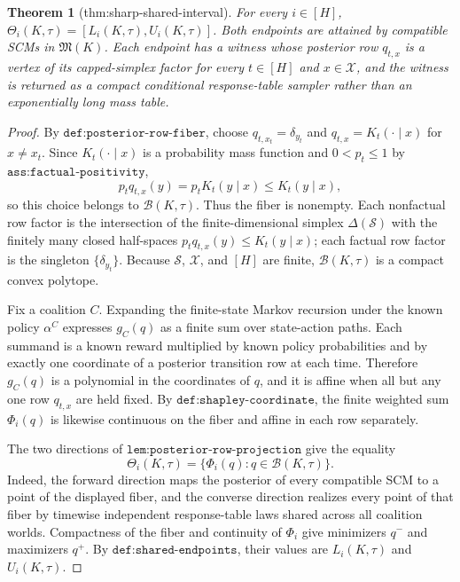 \documentclass{article}
\newtheorem{theorem}{Theorem}
\begin{document}
\begin{theorem}[thm:sharp-shared-interval]\label{thm:sharp-shared-interval}
For every \(i\in[H]\), \(\Theta_i(K,\tau)=[L_i(K,\tau),U_i(K,\tau)]\). Both endpoints are attained by compatible SCMs in \(\mathfrak M(K)\). Each endpoint has a witness whose posterior row \(q_{t,x}\) is a vertex of its capped-simplex factor for every \(t\in[H]\) and \(x\in\mathcal X\), and the witness is returned as a compact conditional response-table sampler rather than an exponentially long mass table.
\end{theorem}
\begin{proof}
By \(\texttt{def:posterior-row-fiber}\), choose \(q_{t,x_t}=\delta_{y_t}\) and \(q_{t,x}=K_t(\cdot\mid x)\) for \(x\ne x_t\).  Since \(K_t(\cdot\mid x)\) is a probability mass function and \(0<p_t\le 1\) by \(\texttt{ass:factual-positivity}\),
\[
 p_tq_{t,x}(y)=p_tK_t(y\mid x)\le K_t(y\mid x),
\]
so this choice belongs to \(\mathcal B(K,\tau)\).  Thus the fiber is nonempty.  Each nonfactual row factor is the intersection of the finite-dimensional simplex \(\Delta(\mathcal S)\) with the finitely many closed half-spaces \(p_tq_{t,x}(y)\le K_t(y\mid x)\); each factual row factor is the singleton \(\{\delta_{y_t}\}\).  Because \(\mathcal S\), \(\mathcal X\), and \([H]\) are finite, \(\mathcal B(K,\tau)\) is a compact convex polytope.

Fix a coalition \(C\).  Expanding the finite-state Markov recursion under the known policy \(\alpha^C\) expresses \(g_C(q)\) as a finite sum over state-action paths.  Each summand is a known reward multiplied by known policy probabilities and by exactly one coordinate of a posterior transition row at each time.  Therefore \(g_C(q)\) is a polynomial in the coordinates of \(q\), and it is affine when all but any one row \(q_{t,x}\) are held fixed.  By \(\texttt{def:shapley-coordinate}\), the finite weighted sum \(\Phi_i(q)\) is likewise continuous on the fiber and affine in each row separately.

The two directions of \(\texttt{lem:posterior-row-projection}\) give the equality
\[
 \Theta_i(K,\tau)
 =\{\Phi_i(q):q\in\mathcal B(K,\tau)\}.
 \tag{1}
\]
Indeed, the forward direction maps the posterior of every compatible SCM to a point of the displayed fiber, and the converse direction realizes every point of that fiber by timewise independent response-table laws shared across all coalition worlds.  Compactness of the fiber and continuity of \(\Phi_i\) give minimizers \(q^-\) and maximizers \(q^+\).  By \(\texttt{def:shared-endpoints}\), their values are \(L_i(K,\tau)\) and \(U_i(K,\tau)\).


\end{proof}
\end{document}
